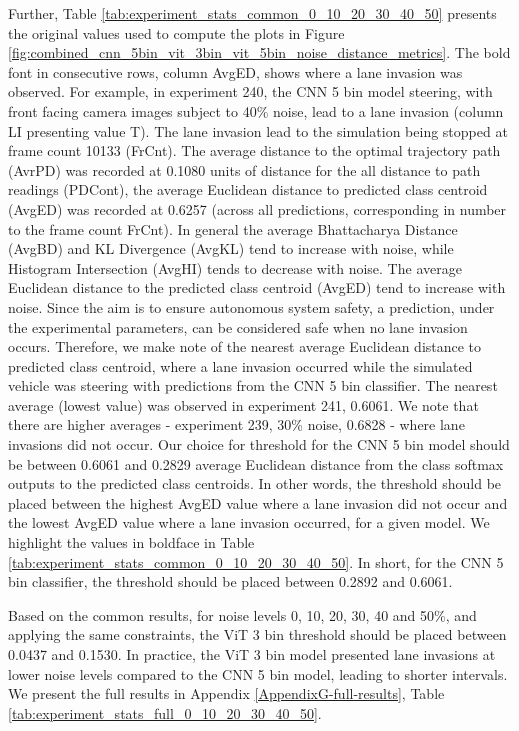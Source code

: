 Further, Table \ref{tab:experiment_stats_common_0_10_20_30_40_50} presents the original values used to compute the plots in Figure \ref{fig:combined_cnn_5bin_vit_3bin_vit_5bin_noise_distance_metrics}. The bold font in consecutive rows, column AvgED, shows where a lane invasion was observed. For example, in experiment 240, the CNN 5 bin model steering, with front facing camera images subject to 40\% noise, lead to a lane invasion (column LI presenting value T). The lane invasion lead to the simulation being stopped at frame count 10133 (FrCnt). The average distance to the optimal trajectory path (AvrPD) was recorded at 0.1080 units of distance for the all distance to path readings (PDCont), the average Euclidean distance to predicted class centroid (AvgED) was recorded at 0.6257 (across all predictions, corresponding in number to the frame count FrCnt). In general the average Bhattacharya Distance (AvgBD) and KL Divergence (AvgKL) tend to increase with noise, while Histogram Intersection (AvgHI) tends to decrease with noise.
The average Euclidean distance to the predicted class centroid (AvgED) tend to increase with noise. 
Since the aim is to ensure autonomous system safety, a prediction, under the experimental parameters, can be considered safe when no lane invasion occurs. Therefore, we make note of the nearest average Euclidean distance to predicted class centroid, where a lane invasion occurred while the simulated vehicle was steering with predictions from the CNN 5 bin classifier. The nearest average (lowest value) was observed in experiment 241, 0.6061. We note that there are higher averages - experiment 239, 30\% noise, 0.6828 - where lane invasions did not occur. Our choice for threshold for the CNN 5 bin model should be between 0.6061 and 0.2829 average Euclidean distance from the class softmax outputs to the predicted class centroids. In other words, the threshold should be placed between the highest AvgED value where a lane invasion did not occur and the lowest AvgED value where a lane invasion occurred, for a given model. We highlight the values in boldface in Table \ref{tab:experiment_stats_common_0_10_20_30_40_50}. In short, for the CNN 5 bin classifier, the threshold should be placed between 0.2892 and 0.6061. 

Based on the common results, for noise levels 0, 10, 20, 30, 40 and 50\%, and applying the same constraints, the ViT 3 bin threshold should be placed between 0.0437 and 0.1530. In practice, the ViT 3 bin model presented lane invasions at lower noise levels compared to the CNN 5 bin model, leading to shorter intervals. We present the full results in Appendix \ref{AppendixG-full-results}, Table \ref{tab:experiment_stats_full_0_10_20_30_40_50}.

